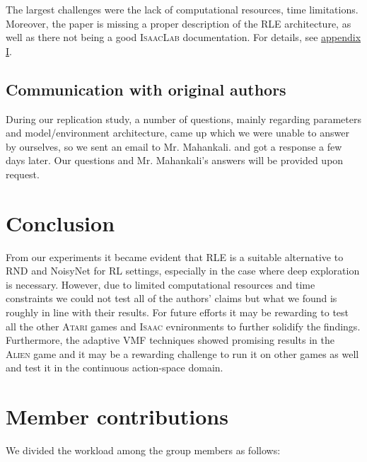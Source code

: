 \documentclass[10pt]{article} %
\begin{document}
The largest challenges were the lack of computational resources, time limitations. Moreover, the paper is missing a proper description of the RLE architecture, as well as there not being a good \textsc{IsaacLab} documentation. For details, see \hyperlink{appendix-difficult}{appendix I}.

\subsection{Communication with original authors}

During our replication study, a number of questions, mainly regarding parameters and model/environment architecture, came up which we were unable to answer by ourselves, so we sent an email to Mr. Mahankali. and got a response a few days later. Our questions and Mr. Mahankali's answers will be provided upon request. 

\vspace{-3pt}
\section{Conclusion}
\vspace{-3pt}

From our experiments it became evident that RLE is a suitable alternative to RND and NoisyNet for RL settings, especially in the case where deep exploration is necessary. However, due to limited computational resources and time constraints we could not test all of the authors' claims but what we found is roughly in line with their results. For future efforts it may be rewarding to test all the other \textsc{Atari} games and \textsc{Isaac} evnironments to further solidify the findings. Furthermore, the adaptive VMF techniques showed promising results in the \textsc{Alien} game and it may be a rewarding challenge to run it on other games as well and test it in the continuous action-space domain.

\clearpage
\section*{Member contributions}

We divided the workload among the group members as follows:
\end{document}
